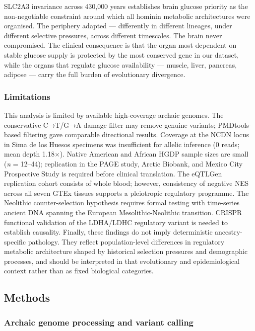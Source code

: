 \documentclass[
  letterpaper,
  DIV=11,
  numbers=noendperiod]{scrartcl}
\begin{document}
SLC2A3 invariance across 430,000 years establishes brain glucose
priority as the non-negotiable constraint around which all hominin
metabolic architectures were organised. The periphery adapted ---
differently in different lineages, under different selective pressures,
across different timescales. The brain never compromised. The clinical
consequence is that the organ most dependent on stable glucose supply is
protected by the most conserved gene in our dataset, while the organs
that regulate glucose availability --- muscle, liver, pancreas, adipose
--- carry the full burden of evolutionary divergence.

\subsubsection{Limitations}\label{limitations}

This analysis is limited by available high-coverage archaic genomes. The
conservative C→T/G→A damage filter may remove genuine variants;
PMDtools-based filtering gave comparable directional results. Coverage
at the NCDN locus in Sima de los Huesos specimens was insufficient for
allelic inference (0 reads; mean depth 1.18×). Native American and
African HGDP sample sizes are small (\emph{n} = 12--44); replication in
the PAGE study, Arctic Biobank, and Mexico City Prospective Study is
required before clinical translation. The eQTLGen replication cohort
consists of whole blood; however, consistency of negative NES across all
seven GTEx tissues supports a pleiotropic regulatory programme. The
Neolithic counter-selection hypothesis requires formal testing with
time-series ancient DNA spanning the European Mesolithic-Neolithic
transition. CRISPR functional validation of the LDHA/LDHC regulatory
variant is needed to establish causality. Finally, these findings do not
imply deterministic ancestry-specific pathology. They reflect
population-level differences in regulatory metabolic architecture shaped
by historical selection pressures and demographic processes, and should
be interpreted in that evolutionary and epidemiological context rather
than as fixed biological categories.

\subsection{Methods}\label{methods}

\subsubsection{Archaic genome processing and variant
calling}\label{archaic-genome-processing-and-variant-calling}
\end{document}
